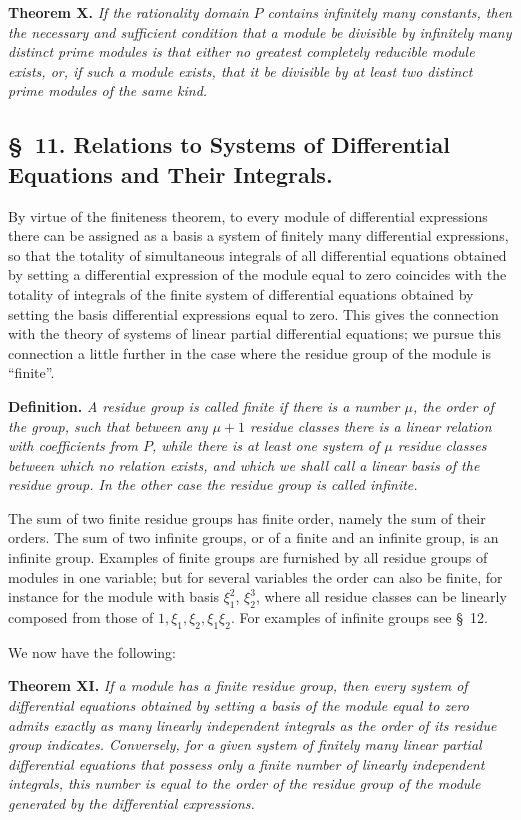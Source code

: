 \documentclass[11pt]{article}
\begin{document}
\textbf{Theorem X.} \emph{If the rationality domain $P$ contains infinitely many constants, then the necessary and sufficient condition that a module be divisible by infinitely many distinct prime modules is that either no greatest completely reducible module exists, or, if such a module exists, that it be divisible by at least two distinct prime modules of the same kind.}

\subsection*{\S~11. Relations to Systems of Differential Equations and Their Integrals.}

By virtue of the finiteness theorem, to every module of differential expressions there can be assigned as a basis a system of finitely many differential expressions, so that the totality of simultaneous integrals of all differential equations obtained by setting a differential expression of the module equal to zero coincides with the totality of integrals of the finite system of differential equations obtained by setting the basis differential expressions equal to zero. This gives the connection with the theory of systems of linear partial differential equations; we pursue this connection a little further in the case where the residue group of the module is ``finite''.

\textbf{Definition.} \emph{A residue group is called finite if there is a number $\mu$, the order of the group, such that between any $\mu+1$ residue classes there is a linear relation with coefficients from $P$, while there is at least one system of $\mu$ residue classes between which no relation exists, and which we shall call a linear basis of the residue group. In the other case the residue group is called infinite.}

The sum of two finite residue groups has finite order, namely the sum of their orders. The sum of two infinite groups, or of a finite and an infinite group, is an infinite group. Examples of finite groups are furnished by all residue groups of modules in one variable; but for several variables the order can also be finite, for instance for the module with basis $\xi_1^2$, $\xi_2^3$, where all residue classes can be linearly composed from those of $1,
\xi_1,
\xi_2,
\xi_1\xi_2$. For examples of infinite groups see \S~12.

We now have the following:

\textbf{Theorem XI.} \emph{If a module has a finite residue group, then every system of differential equations obtained by setting a basis of the module equal to zero admits exactly as many linearly independent integrals as the order of its residue group indicates. Conversely, for a given system of finitely many linear partial differential equations that possess only a finite number of linearly independent integrals, this number is equal to the order of the residue group of the module generated by the differential expressions.}
\end{document}
